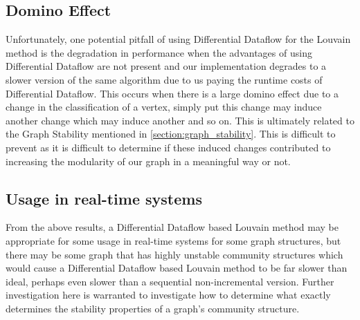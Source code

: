 \subsection{Domino Effect}
Unfortunately, one potential pitfall of using Differential Dataflow for the Louvain method is the degradation in performance when the advantages of using Differential Dataflow are not present and our implementation degrades to a slower version of the same algorithm due to us paying the runtime costs of Differential Dataflow. This occurs when there is a large domino effect due to a change in the classification of a vertex, simply put this change may induce another change which may induce another and so on. This is ultimately related to the Graph Stability mentioned in \cref{section:graph_stability}. This is difficult to prevent as it is difficult to determine if these induced changes contributed to increasing the modularity of our graph in a meaningful way or not. 

\subsection{Usage in real-time systems}
From the above results, a Differential Dataflow based Louvain method may be appropriate for some usage in real-time systems for some graph structures, but there may be some graph that has highly unstable community structures which would cause a Differential Dataflow based Louvain method to be far slower than ideal, perhaps even slower than a sequential non-incremental version. Further investigation here is warranted to investigate how to determine what exactly determines the stability properties of a graph's community structure. 
